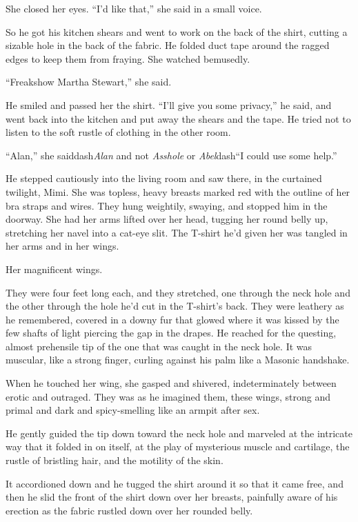 She closed her eyes.  ``I'd like that,'' she said in a small voice.

So he got his kitchen shears and went to work on the back of the
shirt, cutting a sizable hole in the back of the fabric.  He folded
duct tape around the ragged edges to keep them from fraying.  She
watched bemusedly.

``Freakshow Martha Stewart,'' she said.

He smiled and passed her the shirt.  ``I'll give you some privacy,''
he said, and went back into the kitchen and put away the shears and
the tape.  He tried not to listen to the soft rustle of clothing in
the other room.

``Alan,'' she saiddash{}\textit{Alan} and not \textit{Asshole} or
\textit{Abel}dash{}``I could use some help.''

He stepped cautiously into the living room and saw there, in the
curtained twilight, Mimi.  She was topless, heavy breasts marked red
with the outline of her bra straps and wires.  They hung weightily,
swaying, and stopped him in the doorway.  She had her arms lifted over
her head, tugging her round belly up, stretching her navel into a
cat-eye slit.  The T-shirt he'd given her was tangled in her arms and
in her wings.

Her magnificent wings.

They were four feet long each, and they stretched, one through the
neck hole and the other through the hole he'd cut in the T-shirt's
back.  They were leathery as he remembered, covered in a downy fur
that glowed where it was kissed by the few shafts of light piercing
the gap in the drapes.  He reached for the questing, almost prehensile
tip of the one that was caught in the neck hole.  It was muscular,
like a strong finger, curling against his palm like a Masonic
handshake.

When he touched her wing, she gasped and shivered, indeterminately
between erotic and outraged.  They was as he imagined them, these
wings, strong and primal and dark and spicy-smelling like an armpit
after sex.

He gently guided the tip down toward the neck hole and marveled at the
intricate way that it folded in on itself, at the play of mysterious
muscle and cartilage, the rustle of bristling hair, and the motility
of the skin.

It accordioned down and he tugged the shirt around it so that it came
free, and then he slid the front of the shirt down over her breasts,
painfully aware of his erection as the fabric rustled down over her
rounded belly.

